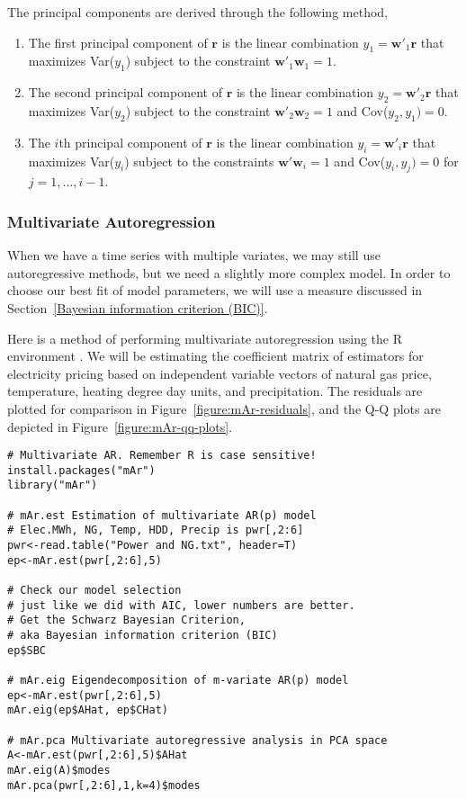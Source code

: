 The principal components are derived through the following method,
\begin{enumerate}
\item The first principal component of $\mathbf{r}$ is the linear combination $y_1=\mathbf{w}'_1 \mathbf{r}$ that maximizes Var($y_1$) subject to the constraint $\mathbf{w}'_1\mathbf{w}_1=1$.
\item The second principal component of $\mathbf{r}$ is the linear combination $y_2=\mathbf{w}'_2 \mathbf{r}$ that maximizes Var($y_2$) subject to the constraint $\mathbf{w}'_2\mathbf{w}_2=1$ and Cov($y_2,y_1)=0$.
\item The $i$th principal component of $\mathbf{r}$ is the linear combination $y_i=\mathbf{w}'_i\mathbf{r}$ that maximizes Var($y_i$) subject to the constraints $\mathbf{w}'\mathbf{w}_i=1$ and Cov($y_i,y_j)=0$ for $j=1,\ldots,i-1$.
\end{enumerate}

\subsubsection{Multivariate Autoregression}
When we have a time series with multiple variates, we may still use autoregressive methods, but we need a slightly more complex model. In order to choose our best fit of model parameters, we will use a measure discussed in Section~\ref{Bayesian information criterion (BIC)}.

Here is a method of performing multivariate autoregression using the R environment \cite{mAr-R}. We will be estimating the coefficient matrix of estimators for electricity pricing based on independent variable vectors of natural gas price, temperature, heating degree day units, and precipitation. The residuals are plotted for comparison in Figure~\ref{figure:mAr-residuals}, and the Q-Q plots are depicted in Figure~\ref{figure:mAr-qq-plots}.
\label{mAr}
\begin{verbatim}
# Multivariate AR. Remember R is case sensitive!
install.packages("mAr")
library("mAr")

# mAr.est Estimation of multivariate AR(p) model
# Elec.MWh, NG, Temp, HDD, Precip is pwr[,2:6]
pwr<-read.table("Power and NG.txt", header=T)
ep<-mAr.est(pwr[,2:6],5)

# Check our model selection
# just like we did with AIC, lower numbers are better.
# Get the Schwarz Bayesian Criterion,
# aka Bayesian information criterion (BIC) 
ep$SBC

# mAr.eig Eigendecomposition of m-variate AR(p) model
ep<-mAr.est(pwr[,2:6],5)
mAr.eig(ep$AHat, ep$CHat)

# mAr.pca Multivariate autoregressive analysis in PCA space
A<-mAr.est(pwr[,2:6],5)$AHat
mAr.eig(A)$modes
mAr.pca(pwr[,2:6],1,k=4)$modes
\end{verbatim}

